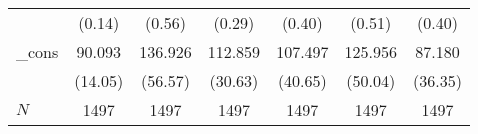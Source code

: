 {\begin{tabular}{l*{6}{c}}
            &                   (0.14)         &                   (0.56)         &                   (0.29)         &                   (0.40)         &                   (0.51)         &                   (0.40)         \\
\_cons      &                   90.093\sym{***}&                  136.926\sym{*}  &                  112.859\sym{***}&                  107.497\sym{**} &                  125.956\sym{*}  &                   87.180\sym{*}  \\
            &                  (14.05)         &                  (56.57)         &                  (30.63)         &                  (40.65)         &                  (50.04)         &                  (36.35)         \\
\hline
\(N\)       &                     1497         &                     1497         &                     1497         &                     1497         &                     1497         &                     1497         \\
\hline\hline
\end{tabular}
}
